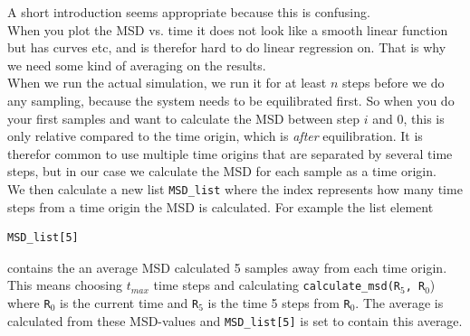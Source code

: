 \documentclass{article}
\newcommand{\code}[1]{\texttt{#1}} %
\begin{document}
A short introduction seems appropriate because this is confusing.\\

When you plot the MSD vs. time it does not look like a smooth linear
function but has curves etc, and is therefor hard to do linear regression
on. That is why we need some kind of averaging on the results.\\

When we run the actual simulation, we run it for at least 
$n$ steps before we do any sampling, because the system needs
to be equilibrated first.
So when you do your first samples and 
want to calculate the MSD between step $i$ and $0$,
this is only relative compared to the time origin,
which is {\em after} equilibration. 
It is therefor common to use multiple time origins that are separated
by several time steps, but in our case we calculate the MSD
for each sample as a time origin.\\

We then calculate a new list \code{MSD\_list} where the index represents
how many time steps from a time origin the MSD is calculated.
For example the list element

\begin{lstlisting}
MSD_list[5]
\end{lstlisting}

contains the an average MSD calculated 5 samples away from each 
time origin. This means choosing $t_{max}$ time steps and calculating 
\code{calculate\_msd(R$_5$, R$_0$})
where \code{R$_0$} is the current time and
\code{R$_5$} is the time 5 steps from \code{R$_0$}.
The average is
calculated from these MSD-values and \code{MSD\_list[5]} is set to contain this average.\\
\end{document}
